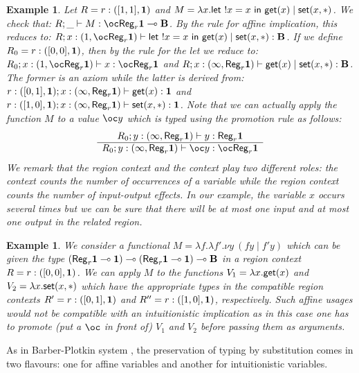 \documentclass[11pt]{article}
\newtheorem{example}[theorem]{Example}
\newcommand{\Gives}{\vdash}             \newcommand{\IGives}{\vdash_{I}}        \newcommand{\AIGives}{\vdash_{{\it AI}}} \newcommand{\CGives}{\vdash_{C}}
\newcommand{\hyp}[3]{#1:(#2, #3)}
\newcommand{\letm}[3]{{\sf let} \ ! #1 = #2 \ {\sf in} \ #3}    \newcommand{\tertype}{{\bf 1}}
\newcommand{\behtype}{{\bf B}}
\newcommand{\infer}[2]{\begin{array}{c} #1 \\ \hline #2 \end{array}}
\newcommand{\st}[2]{{\sf set}(#1,#2)}
\newcommand{\rgtype}[2]{{\it {\sf Reg}_{#1} #2}}
\newcommand{\get}[1]{{\sf get}(#1)}
\newcommand{\new}[2]{\nu #1 \ #2}
\newcommand{\regtype}[2]{{\sf Reg}_{#1} #2}
\newcommand{\upair}[2]{[#1,#2]}
\begin{document}
\begin{example}
Let $R=\hyp{r}{\upair{1}{1}}{\tertype}$ and 
$M=\lambda x.\letm{x}{x}{\get{x} \mid \st{x}{*}}$.
We check that: $R;\_ \Gives M: \bang \regtype{r}{\tertype} \limp \behtype$.
By the rule for affine implication, this reduces to:
$R;\hyp{x}{1}{\bang \regtype{r}{\tertype}} \Gives \letm{x}{x}{\get{x} \mid \st{x}{*}}: \behtype$.
If we define $R_0=\hyp{r}{\upair{0}{0}}{\tertype}$, then by the rule for the
{\sf let} we reduce to:
$R_0; \hyp{x}{1}{\bang \regtype{r}{\tertype}} \Gives x: \bang \regtype{r}{\tertype}$
and 
$R; \hyp{x}{\infty}{\regtype{r}{\tertype}} \Gives \get{x} \mid \st{x}{*} : \behtype$.
The former is an axiom while the latter is derived from:
$\hyp{r}{\upair{0}{1}}{\tertype};  
\hyp{x}{\infty}{\regtype{r}{\tertype}}
\Gives \get{x}:\tertype$ 
and
$\hyp{r}{\upair{1}{0}}{\tertype};  
\hyp{x}{\infty}{\regtype{r}{\tertype}} 
\Gives \st{x}{*}:\tertype$.
Note that we can actually apply the function $M$ to a value $\bang y$ which 
is typed using the promotion rule as follows:
\[
\infer{R_0;\hyp{y}{\infty}{\regtype{r}{\tertype}} \Gives y: \regtype{r}{\tertype}}
{R_0;\hyp{y}{\infty}{\regtype{r}{\tertype}} \Gives \bang y: \bang \regtype{r}{\tertype}}
\]
We remark that the region context and the context play two
different roles: the context counts the number of occurrences of a variable
while the region context counts the number of input-output effects. 
In our example, the variable $x$ occurs several times but we can be sure
that there will be at most one input and at most one output in the related
region.
\end{example}

\begin{example}
We consider a {\em functional} $M=\lambda f.\lambda f'.\new{y}{(fy\mid  f'y)}$
which can be given the type 
$(\rgtype{r}{\tertype}\limp\tertype) \limp 
 (\rgtype{r}{\tertype}\limp\tertype) \limp \behtype$ in a region
context $R=\hyp{r}{\upair{0}{0}}{\tertype}$. We can apply $M$ to 
the functions $V_1=\lambda x.\get{x}$ and $V_2=\lambda x.\st{x}{*}$ which
have the appropriate types in the compatible region contexts 
$R'= \hyp{r}{\upair{0}{1}}{\tertype}$ and 
$R''= \hyp{r}{\upair{1}{0}}{\tertype}$, respectively.
Such {\em affine} usages would not be compatible with an
intuitionistic implication as in this case
one has to {\em promote} (put a $\bang$ in front of) 
$V_1$ and $V_2$ before passing them as arguments.
\end{example}


As in Barber-Plotkin system \cite{Barber96}, the preservation of typing by
substitution comes in two flavours: one for affine variables and another
for intuitionistic variables.
\end{document}
